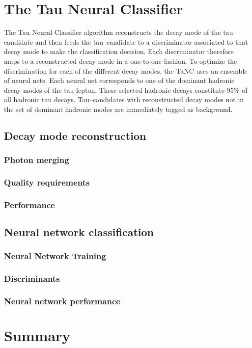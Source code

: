\section{The Tau Neural Classifier}

The Tau Neural Classifier algorithm reconstructs the decay mode of the
tau--candidate and then feeds the tau--candidate to a discriminator associated
to that decay mode to make the classification decision.  Each discriminator
therefore maps to a reconstructed decay mode in a one-to-one fashion.  To
optimize the discrimination for each of the different decay modes, the TaNC uses
an ensemble of neural nets.  Each neural net corresponds to one of the dominant
hadronic decay modes of the tau lepton.  These selected hadronic decays
constitute 95\% of all hadronic tau decays.  Tau--candidates with reconstructed
decay modes not in the set of dominant hadronic modes are immediately tagged as
background.  

\subsection{Decay mode reconstruction}
\label{sec:decay_mode_reco}

\subsubsection{Photon merging}

\subsubsection{Quality requirements}

\subsubsection{Performance}


\subsection{Neural network classification}
\subsubsection{Neural Network Training}

\subsubsection{Discriminants}
\label{sec:tanc_nn_discriminants}

\subsubsection{Neural network performance}

\section{Summary}


\ifx\master\undefined\fi
